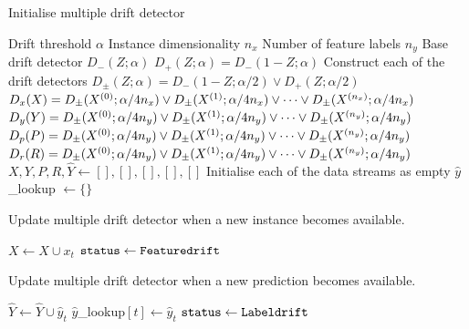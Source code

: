 \begin{algorithm}
    \caption{Initialise multiple drift detector}
    \label{alg:mdd_init}
    \begin{algorithmic}
        \Require Drift threshold $\alpha$
        \Require Instance dimensionality $n_x$
        \Require Number of feature labels $n_y$
        \Require Base drift detector $D_-(Z;\alpha)$
        \State $D_+(Z;\alpha) = D_-(1-Z;\alpha)$
        \Comment Construct each of the drift detectors
        \State $D_\pm(Z;\alpha) = D_-(1-Z;\alpha/2) \vee D_+(Z;\alpha/2)$
        \State $D_x(X) = D_\pm(X^{(0)};\alpha/4n_x) \vee D_\pm(X^{(1)};\alpha/4n_x) \vee \dots \vee D_\pm(X^{(n_x)};\alpha/4n_x)$
        \State $D_y(Y) = D_\pm(X^{(0)};\alpha/4n_y) \vee D_\pm(X^{(1)};\alpha/4n_y) \vee \dots \vee D_\pm(X^{(n_y)};\alpha/4n_y)$
        \State $D_p(P) = D_\pm(X^{(0)};\alpha/4n_y) \vee D_\pm(X^{(1)};\alpha/4n_y) \vee \dots \vee D_\pm(X^{(n_y)};\alpha/4n_y)$
        \State $D_r(R) = D_\pm(X^{(0)};\alpha/4n_y) \vee D_\pm(X^{(1)};\alpha/4n_y) \vee \dots \vee D_\pm(X^{(n_y)};\alpha/4n_y)$
        \State $X, Y, P, R, \hat{Y} \gets [], [], [], [], []$
        \Comment Initialise each of the data streams as empty
        \State $\hat{y}$\_lookup $\gets \{\}$
      \EndFunction
    \end{algorithmic}
\end{algorithm}

\begin{algorithm}
    \caption{Update multiple drift detector when a new instance becomes available.}
    \label{alg:mdd_instance}
    \begin{algorithmic}
        \State $X\gets X\cup x_t$
          \State ${\tt status} \gets {\tt Feature drift}$
        \EndIf
      \EndFunction
    \end{algorithmic}
\end{algorithm}

\begin{algorithm}
    \caption{Update multiple drift detector when a new prediction becomes available.}
    \label{alg:mdd_prediction}
    \begin{algorithmic}
            \State $\hat{Y}\gets \hat{Y}\cup \hat{y}_t$
            \State $\hat{y}$\_lookup$[t] \gets \hat{y}_t$
              \State ${\tt status} \gets {\tt Label drift}$
            \EndIf
        \EndFunction
    \end{algorithmic}
\end{algorithm}

